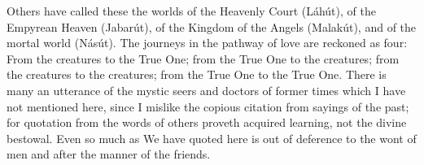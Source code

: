 \documentclass[12pt]{article}
\begin{document}
\vspace{2ex}
 {
Others have called these the worlds of the Heavenly Court (L\'{a}h\'{u}t), of the Empyrean Heaven (Jabar\'{u}t), of the Kingdom of the Angels (Malak\'{u}t), and of the mortal world (N\'{a}s\'{u}t).
}
\vspace{2ex}
 {
The journeys in the pathway of love are reckoned as four:
}
\vspace{2ex}
 {
From the creatures to the True One; from the True One to the creatures; from the creatures to the creatures; from the True One to the True One.
}
\vspace{2ex}
 {
There is many an utterance of the mystic seers and doctors of former times which I have not mentioned here,
}
\vspace{2ex}
 {
since I mislike the copious citation from sayings of the past;
}
\vspace{2ex}
 {
for quotation from the words of others proveth acquired learning, not the divine bestowal.
}
\vspace{2ex}
 {
Even so much as We have quoted here is out of deference to the wont of men and after the manner of the friends.
}
\end{document}

